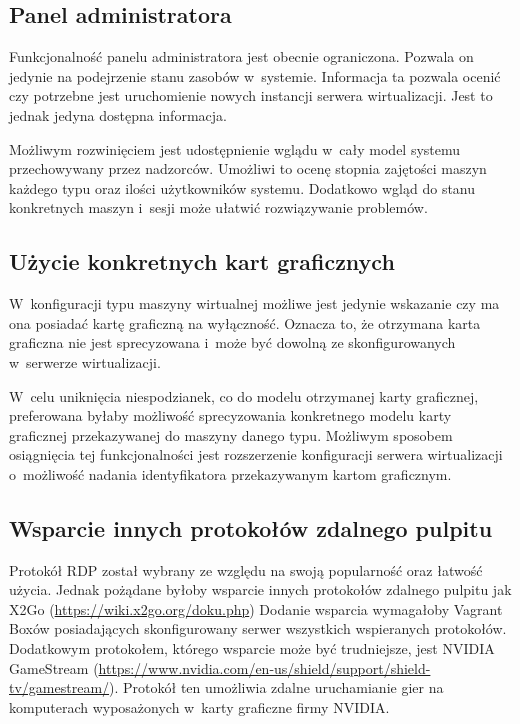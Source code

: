 \documentclass[../podsumowanie.tex]{subfiles}
\begin{document}
\label{future_directions}

\subsection{Panel administratora}

Funkcjonalność panelu administratora jest obecnie ograniczona. Pozwala on jedynie na podejrzenie stanu zasobów w~systemie. Informacja ta pozwala ocenić czy potrzebne jest uruchomienie nowych instancji serwera wirtualizacji. Jest to jednak jedyna dostępna informacja.

Możliwym rozwinięciem jest udostępnienie wglądu w~cały model systemu przechowywany przez nadzorców. Umożliwi to ocenę stopnia zajętości maszyn każdego typu oraz ilości użytkowników systemu. Dodatkowo wgląd do stanu konkretnych maszyn i~sesji może ułatwić rozwiązywanie problemów.

\subsection{Użycie konkretnych kart graficznych}

W~konfiguracji typu maszyny wirtualnej możliwe jest jedynie wskazanie czy ma ona posiadać kartę graficzną na wyłączność. Oznacza to, że otrzymana karta graficzna nie jest sprecyzowana i~może być dowolną ze skonfigurowanych w~serwerze wirtualizacji.

W~celu uniknięcia niespodzianek, co do modelu otrzymanej karty graficznej, preferowana byłaby możliwość sprecyzowania konkretnego modelu karty graficznej przekazywanej do maszyny danego typu. Możliwym sposobem osiągnięcia tej funkcjonalności jest rozszerzenie konfiguracji serwera wirtualizacji o~możliwość nadania identyfikatora przekazywanym kartom graficznym.

\subsection{Wsparcie innych protokołów zdalnego pulpitu}

Protokół RDP został wybrany ze względu na swoją popularność oraz łatwość użycia. Jednak pożądane byłoby wsparcie innych protokołów zdalnego pulpitu jak X2Go (\url{https://wiki.x2go.org/doku.php})
Dodanie wsparcia wymagałoby Vagrant Boxów posiadających skonfigurowany serwer wszystkich wspieranych protokołów. Dodatkowym protokołem, którego wsparcie może być trudniejsze, jest NVIDIA GameStream (\url{https://www.nvidia.com/en-us/shield/support/shield-tv/gamestream/}).
Protokół ten umożliwia zdalne uruchamianie gier na komputerach wyposażonych w~karty graficzne firmy NVIDIA.
\end{document}
